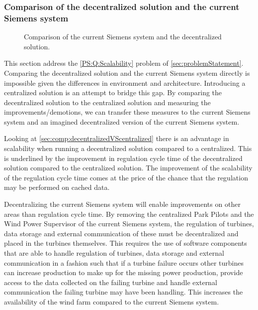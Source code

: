 \FloatBarrier

\subsubsection{Comparison of the decentralized solution and the current Siemens system}

\begin{figure}[!h]
	\centering
	
	\caption[Comparison of the current centralized solution and the decentralized solution]{
		\label{fig:projectDiffOverviewSiemensDecentralized}
		\footnotesize{%
			Comparison of the current Siemens system and the decentralized solution.
		}
	}
\end{figure}

This section address the \ref{PS:Q:Scalability} problem of \cref{sec:problemStatement}.
Comparing the decentralized solution and the current Siemens system directly is impossible given the differences in environment and architecture. Introducing a centralized solution is an attempt to bridge this gap. By comparing the decentralized solution to the centralized solution and measuring the improvements/demotions, we can transfer these measures to the current Siemens system and an imagined decentralized version of the current Siemens system.

Looking at \cref{sec:comp:decentralizedVScentralized} there is an advantage in scalability when running a decentralized solution compared to a centralized. This is underlined by the improvement in regulation cycle time of the decentralized solution compared to the centralized solution. The improvement of the scalability of the regulation cycle time comes at the price of the chance that the regulation may be performed on cached data.

Decentralizing the current Siemens system will enable improvements on other areas than regulation cycle time. By removing the centralized Park Pilots and the Wind Power Supervisor of the current Siemens system, the regulation of turbines, data storage and external communication of these must be decentralized and placed in the turbines themselves. This requires the use of software components that are able to handle regulation of turbines, data storage and external communication in a fashion such that if a turbine failure occurs other turbines can increase production to make up for the missing power production, provide access to the data collected on the failing turbine and handle external communication the failing turbine may have been handling. This increases the availability of the wind farm compared to the current Siemens system.


